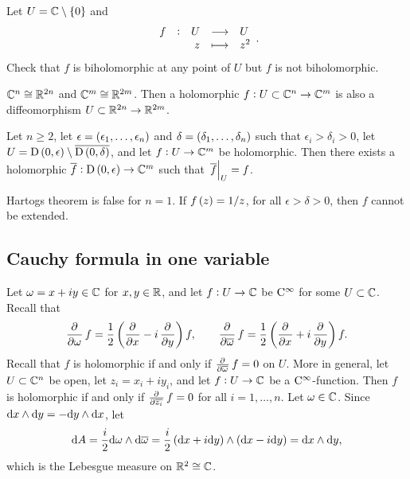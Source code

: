 \begin{example}
Let $ U = \CC \setminus \cbr{0} $ and
$$ \function[f]{U}{U}{z}{z^2}. $$
Check that $ f $ is biholomorphic at any point of $ U $ but $ f $ is not biholomorphic.
\end{example}

\begin{remark*}
$ \mathbb{C}^n \cong \mathbb{R}^{2n} $ and $ \mathbb{C}^m \cong \mathbb{R}^{2m} $. Then a holomorphic $ f : U \subset \mathbb{C}^n \to \mathbb{C}^m $ is also a diffeomorphism $ U \subset \mathbb{R}^{2n} \to \mathbb{R}^{2m} $.
\end{remark*}

\begin{theorem}[Hartogs]
Let $ n \ge 2 $, let $ \epsilon = \br{\epsilon_1, \dots, \epsilon_n} $ and $ \delta = \br{\delta_1, \dots, \delta_n} $ such that $ \epsilon_i > \delta_i > 0 $, let $ U = \D\br{0, \epsilon} \setminus \overline{\D\br{0, \delta}} $, and let $ f : U \to \mathbb{C}^m $ be holomorphic. Then there exists a holomorphic $ \overline{f} : \D\br{0, \epsilon} \to \CC^m $ such that $ \left. \overline{f} \right|_U = f $.
\end{theorem}

\begin{example*}
Hartogs theorem is false for $ n = 1 $. If $ f\br{z} = 1 / z $, for all $ \epsilon > \delta > 0 $, then $ f $ cannot be extended.
\end{example*}

\subsection{Cauchy formula in one variable}


Let $ \omega = x + iy \in \mathbb{C} $ for $ x, y \in \mathbb{R} $, and let $ f : U \to \mathbb{C} $ be $ \mathrm{C}^\infty $ for some $ U \subset \mathbb{C} $. Recall that
$$ \dpd{}{\omega}f = \dfrac{1}{2}\br{\dpd{}{x} - i\dpd{}{y}}f, \qquad \dpd{}{\overline{\omega}}f = \dfrac{1}{2}\br{\dpd{}{x} + i\dpd{}{y}}f. $$
Recall that $ f $ is holomorphic if and only if $ \tpd{}{\overline{\omega}}f = 0 $ on $ U $. More in general, let $ U \subset \mathbb{C}^n $ be open, let $ z_i = x_i + iy_i $, and let $ f : U \to \mathbb{C} $ be a $ \mathrm{C}^\infty $-function. Then $ f $ is holomorphic if and only if $ \tpd{}{\overline{z_i}}f = 0 $ for all $ i = 1, \dots, n $. Let $ \omega \in \mathbb{C} $. Since $ \mathrm{d} x \wedge \mathrm{d} y = -\mathrm{d} y \wedge \mathrm{d} x $, let
$$ \d A = \dfrac{i}{2} \d\omega \wedge \d\overline{\omega} = \dfrac{i}{2} \br{\d x + i \d y} \wedge \br{\d x - i \d y} = \d x \wedge \d y, $$
which is the Lebesgue measure on $ \mathbb{R}^2 \cong \mathbb{C} $.

